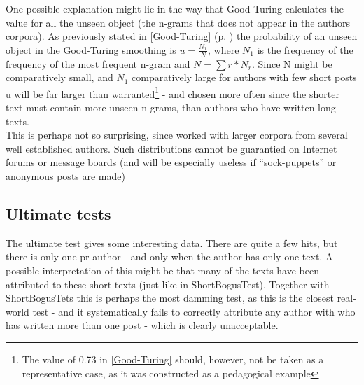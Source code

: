 One possible explanation might lie in the way that Good-Turing calculates the value for all the unseen object (the n-grams that does not appear in the authors corpora). As previously stated in \ref{Good-Turing} (p. \pageref{Good-Turing}) the probability of an unseen object in the Good-Turing smoothing is $u =\frac{N_1}{N}$, where $N_1$ is the frequency of the frequency of the most frequent n-gram and $N =\sum r * N_r$. Since N might be comparatively small, and $N_1$ comparatively large for authors with few short posts u will be far larger than warranted\footnote{The value of 0.73 in \ref{Good-Turing} should, however, not be taken as a representative case, as it was constructed as a pedagogical example} - and chosen more often since the shorter text must contain more unseen n-grams, than authors who have written long texts.\\

This is perhaps not so surprising, since \cite{nr4} worked with larger corpora from several well established authors. Such distributions cannot be guarantied on Internet forums or message boards (and will be especially useless if ``sock-puppets'' or anonymous posts are made) 

\subsection{Ultimate tests}
The ultimate test gives some interesting data. There are quite a few hits, but there is only one pr author - and only when the author has only one text.  A possible interpretation of this might be that many of the texts have been attributed to these short texts (just like in ShortBogusTest). Together with ShortBogusTets this is perhaps the most damming test, as this is the closest real-world test - and it systematically fails to correctly attribute any author with who has written more than one post - which is clearly unacceptable.  

